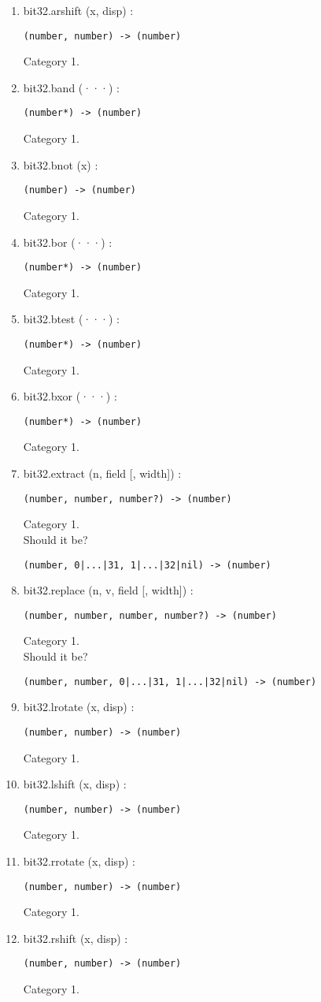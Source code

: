 \documentclass{paper}
\begin{document}
\begin{enumerate}
\item bit32.arshift (x, disp) :
\begin{verbatim}
(number, number) -> (number)
\end{verbatim}
Category 1.
\item bit32.band (···) :
\begin{verbatim}
(number*) -> (number)
\end{verbatim}
Category 1.
\item bit32.bnot (x) :
\begin{verbatim}
(number) -> (number)
\end{verbatim}
Category 1.
\item bit32.bor (···) :
\begin{verbatim}
(number*) -> (number)
\end{verbatim}
Category 1.
\item bit32.btest (···) :
\begin{verbatim}
(number*) -> (number)
\end{verbatim}
Category 1.
\item bit32.bxor (···) :
\begin{verbatim}
(number*) -> (number)
\end{verbatim}
Category 1.
\item bit32.extract (n, field [, width]) :
\begin{verbatim}
(number, number, number?) -> (number)
\end{verbatim}
Category 1.
\\
Should it be?
\begin{verbatim}
(number, 0|...|31, 1|...|32|nil) -> (number)
\end{verbatim}
\item bit32.replace (n, v, field [, width]) :
\begin{verbatim}
(number, number, number, number?) -> (number)
\end{verbatim}
Category 1.
\\
Should it be?
\begin{verbatim}
(number, number, 0|...|31, 1|...|32|nil) -> (number)
\end{verbatim}
\item bit32.lrotate (x, disp) :
\begin{verbatim}
(number, number) -> (number)
\end{verbatim}
Category 1.
\item bit32.lshift (x, disp) :
\begin{verbatim}
(number, number) -> (number)
\end{verbatim}
Category 1.
\item bit32.rrotate (x, disp) :
\begin{verbatim}
(number, number) -> (number)
\end{verbatim}
Category 1.
\item bit32.rshift (x, disp) :
\begin{verbatim}
(number, number) -> (number)
\end{verbatim}
Category 1.
\end{enumerate}
\end{document}
